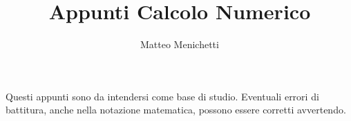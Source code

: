 \documentclass[a4paper,10pt]{article}
\numberwithin{equation}{section}
\theoremstyle{definition}
\begin{document}
\title{Appunti Calcolo Numerico}
\author{Matteo Menichetti}
\maketitle

\noindent Questi appunti sono da intendersi come base di studio. Eventuali errori di battitura, anche nella notazione matematica, possono essere corretti avvertendo.

\tableofcontents

\clearpage

\printglossary























%
\end{document}
